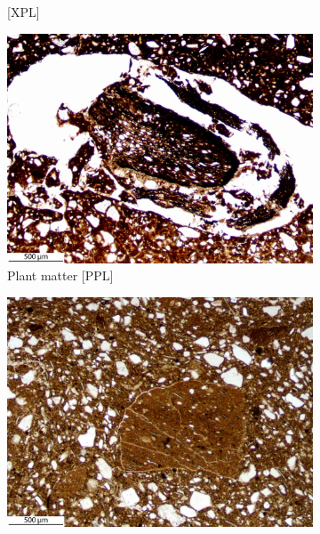 \documentclass[a4paper]{article}
\begin{document}
\begin{figure}[H]
\begin{subfigure}[t]{.49\textwidth}
		\caption{[XPL]}
	\end{subfigure}
	\begin{subfigure}[t]{.32\textwidth}
		\includegraphics[width=\textwidth]{ThinSections/51-4_4x_PPL.jpg}
		\caption{Plant matter [PPL]}
	\end{subfigure}\hspace{.1em}\hfill
	\begin{subfigure}[t]{.32\textwidth}
		\includegraphics[width=\textwidth]{ThinSections/51-5_4x_PPL.jpg}

\end{subfigure}
\end{figure}
\end{document}
